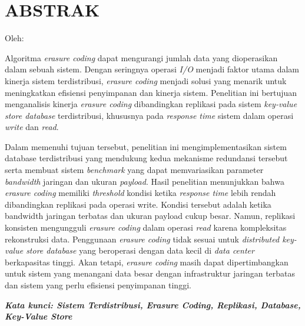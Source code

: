 \clearpage
\chapter*{ABSTRAK}

\begin{center}
  \center
  \begin{singlespace}
    \large\bfseries\MakeUppercase{\thetitle}
    
    \normalfont\normalsize
    Oleh:
    
    \bfseries \theauthor
  \end{singlespace}
\end{center}

\begin{singlespace}
  \small
  Algoritma \textit{erasure coding} dapat mengurangi jumlah data yang dioperasikan dalam sebuah sistem. Dengan seringnya operasi \textit{I/O} menjadi faktor utama dalam kinerja sistem terdistribusi, \textit{erasure coding} menjadi solusi yang menarik untuk meningkatkan efisiensi penyimpanan dan kinerja sistem. Penelitian ini bertujuan menganalisis kinerja \textit{erasure coding} dibandingkan replikasi pada sistem \textit{key-value store database} terdistribusi, khususnya pada \textit{response time} sistem dalam operasi \textit{write} dan \textit{read}.
  
  Dalam memenuhi tujuan tersebut, penelitian ini mengimplementasikan sistem database terdistribusi yang mendukung kedua mekanisme redundansi tersebut serta membuat sistem \textit{benchmark} yang dapat memvariasikan parameter \textit{bandwidth} jaringan dan ukuran \textit{payload}. Hasil penelitian menunjukkan bahwa \textit{erasure coding} memiliki \textit{threshold} kondisi ketika \textit{response time} lebih rendah dibandingkan replikasi pada operasi write. Kondisi tersebut adalah ketika bandwidth jaringan terbatas dan ukuran payload cukup besar. Namun, replikasi konsisten mengungguli \textit{erasure coding} dalam operasi \textit{read} karena kompleksitas rekonstruksi data. Penggunaan \textit{erasure coding} tidak sesuai untuk \textit{distributed key-value store database} yang beroperasi dengan data kecil di \textit{data center} berkapasitas tinggi. Akan tetapi, \textit{erasure coding} masih dapat dipertimbangkan untuk sistem yang menangani data besar dengan infrastruktur jaringan terbatas dan sistem yang perlu efisiensi penyimpanan tinggi.
  
  \textbf{\textit{Kata kunci: Sistem Terdistribusi, Erasure Coding, Replikasi, Database, Key-Value Store }}
  
\end{singlespace}
\clearpage